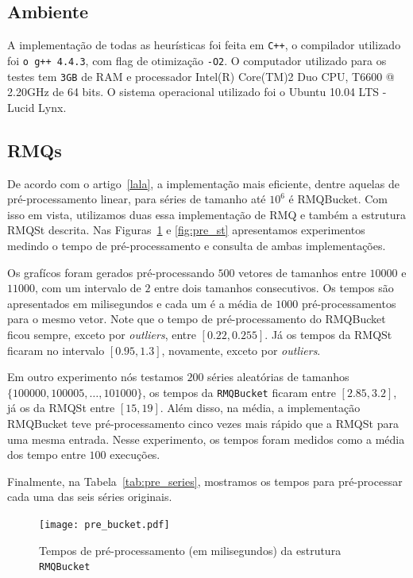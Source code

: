 \documentclass[dissertacao, brazil]{ThesisPUC}
\begin{document}
\subsection{Ambiente}

A implementação de todas as heurísticas foi feita em \verb|C++|, o compilador
utilizado foi \verb|o g++ 4.4.3|, com flag de otimização \verb|-O2|. O computador
utilizado para os testes tem \verb|3GB| de RAM e processador Intel(R) Core(TM)2 Duo CPU, T6600  @ 2.20GHz
de 64 bits. O sistema operacional utilizado foi o Ubuntu 10.04 LTS - Lucid Lynx.


\subsection{RMQs}

De acordo com o artigo~\ref{lala}, a implementação mais eficiente, dentre aquelas
de pré-processamento linear, para séries de tamanho até $10^6$ é RMQBucket.
Com isso em vista, utilizamos duas essa implementação de RMQ e também a estrutura
RMQSt descrita. Nas Figuras~\ref{fig:pre_bucket} e \ref{fig:pre_st} apresentamos experimentos medindo o tempo de pré-processamento
e consulta de ambas implementações.

Os grafícos foram gerados pré-processando $500$ vetores de tamanhos entre
$10000$ e $11000$, com um intervalo de $2$ entre dois tamanhos consecutivos.
Os tempos são apresentados em milisegundos e cada um é a média
de $1000$ pré-processamentos para o mesmo vetor. Note que o tempo de pré-processamento
do RMQBucket ficou sempre, exceto por \textit{outliers}, entre $[0.22, 0.255]$.
Já os tempos da RMQSt ficaram no intervalo $[0.95, 1.3]$, novamente, exceto por \textit{outliers}.

Em outro experimento nós testamos $200$ séries aleatórias de tamanhos $\{100000, 100005, \ldots, 101000\}$,
os tempos da {\tt RMQBucket} ficaram entre $[2.85, 3.2]$, já os da RMQSt entre $[15,19]$. 
Além disso, na média, a implementação RMQBucket teve pré-processamento cinco vezes mais rápido
que a RMQSt para uma mesma entrada. Nesse experimento, os tempos foram medidos como a média
dos tempo entre $100$ execuções.

Finalmente, na Tabela~\ref{tab:pre_series}, mostramos os tempos para pré-processar cada uma das seis
séries originais.


\begin{figure}[htp]
\begin{center}
\texttt{[image: pre\_bucket.pdf]}
\caption{Tempos de pré-processamento (em milisegundos) da estrutura {\tt RMQBucket} }
\label{fig:pre_bucket}
\end{center}
\end{figure}
\end{document}
